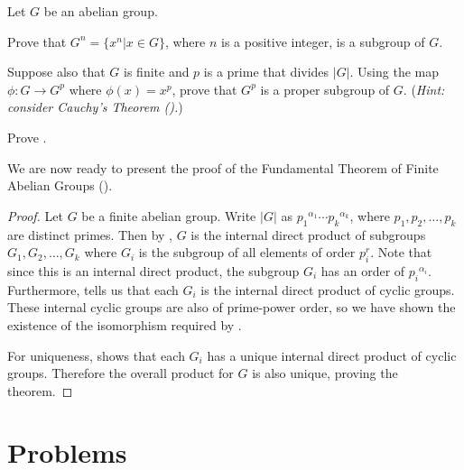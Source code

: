 \begin{exercise}\label{exercise-group-power-is-subgroup}
    Let $G$ be an abelian group.
    \begin{partquestions}{\roman*}
        \item Prove that $G^n = \{x^n \vert x \in G\}$, where $n$ is a positive integer, is a subgroup of $G$.
        \item Suppose also that $G$ is finite and $p$ is a prime that divides $|G|$. Using the map $\phi: G \to G^p$ where $\phi(x) = x^p$, prove that $G^p$ is a proper subgroup of $G$.\newline
        (\textit{Hint: consider Cauchy's Theorem ().})
    \end{partquestions}
\end{exercise}

\begin{exercise}\label{exercise-prove-lemma-fundamental-theorem-of-finite-abelian-groups-3}
    Prove .
\end{exercise}

\newpage

We are now ready to present the proof of the Fundamental Theorem of Finite Abelian Groups ().
\begin{proof}
    Let $G$ be a finite abelian group. Write $|G|$ as ${p_1}^{\alpha_1}\cdots{p_k}^{\alpha_k}$, where $p_1, p_2, \dots, p_k$ are distinct primes. Then by , $G$ is the internal direct product of subgroups $G_1, G_2, \dots, G_k$ where $G_i$ is the subgroup of all elements of order $p_i^r$. Note that since this is an internal direct product, the subgroup $G_i$ has an order of ${p_i}^{\alpha_i}$. Furthermore,  tells us that each $G_i$ is the internal direct product of cyclic groups. These internal cyclic groups are also of prime-power order, so we have shown the existence of the isomorphism required by .
    
    For uniqueness,  shows that each $G_i$ has a unique internal direct product of cyclic groups. Therefore the overall product for $G$ is also unique, proving the theorem.
\end{proof}

\newpage

\section{Problems}
